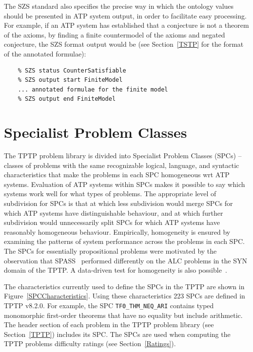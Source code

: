 \documentclass{easychair}
\begin{document}
The SZS standard also specifies the precise way in which the ontology values should be presented
in ATP system output, in order to facilitate easy processing.
For example, if an ATP system has established that a conjecture is not a theorem of the axioms,
by finding a finite countermodel of the axioms and negated conjecture, the SZS format output 
would be (see Section~\ref{TSTP} for the format of the annotated formulae): \\

\begin{minipage}{\textwidth}
\begin{verbatim}
    % SZS status CounterSatisfiable
    % SZS output start FiniteModel
    ... annotated formulae for the finite model 
    % SZS output end FiniteModel
\end{verbatim}
\end{minipage}

\vspace*{1em}

\section{Specialist Problem Classes}
\label{SPCs}

The TPTP problem library is divided into Specialist Problem Classes (SPCs) -- classes of problems 
with the same recognizable logical, language, and syntactic characteristics that make the
problems in each SPC homogeneous wrt ATP systems.
Evaluation of ATP systems within SPCs makes it possible to say which systems work well for what 
types of problems. 
The appropriate level of subdivision for SPCs is that at which less subdivision would merge 
SPCs for which ATP systems have distinguishable behaviour, and at which further subdivision
would unnecessarily split SPCs for which ATP systems have reasonably homogeneous behaviour.
Empirically, homogeneity is ensured by examining the patterns of system performance across the 
problems in each SPC. 
The SPCs for essentially propositional problems were motivated by the observation that 
SPASS~\cite{WA+99} performed differently on the ALC problems in the SYN domain of the TPTP.
A data-driven test for homogeneity is also possible~\cite{FS02}.

The characteristics currently used to define the SPCs in the TPTP are shown in 
Figure~\ref{SPCCharacteristics}.
Using these characteristics 223 SPCs are defined in TPTP v8.2.0. 
For example, the SPC
{\tt TF0\_THM\_NEQ\_ARI} contains typed monomorphic first-order theorems that have no equality but 
include arithmetic.
The header section of each problem in the TPTP problem library (see Section~\ref{TPTP}) includes 
its SPC.
The SPCs are used when computing the TPTP problems difficulty ratings (see Section~\ref{Ratings}).
\end{document}
